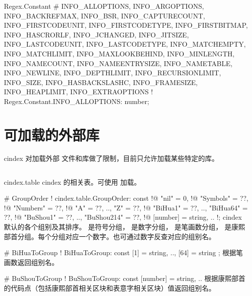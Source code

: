 \documentclass[class=article,doc={kv-usage}]{cusdoc}
\newcommand*\LUA{\texorpdfstring{\textcon{lua}}{lua}}
\begin{document}
\begin{luadoc*}{Regex.Constant}
# INFO_ALLOPTIONS, INFO_ARGOPTIONS, INFO_BACKREFMAX, INFO_BSR, INFO_CAPTURECOUNT, INFO_FIRSTCODEUNIT, INFO_FIRSTCODETYPE, INFO_FIRSTBITMAP, INFO_HASCRORLF, INFO_JCHANGED, INFO_JITSIZE, INFO_LASTCODEUNIT, INFO_LASTCODETYPE, INFO_MATCHEMPTY, INFO_MATCHLIMIT, INFO_MAXLOOKBEHIND, INFO_MINLENGTH, INFO_NAMECOUNT, INFO_NAMEENTRYSIZE, INFO_NAMETABLE, INFO_NEWLINE, INFO_DEPTHLIMIT, INFO_RECURSIONLIMIT, INFO_SIZE, INFO_HASBACKSLASHC, INFO_FRAMESIZE, INFO_HEAPLIMIT, INFO_EXTRAOPTIONS
! Regex.Constant.INFO_ALLOPTIONS: number;
\end{luadoc*}


\section{可加载的外部库}

cindex 对加载外部 \LUA 文件和库做了限制，目前只允许加载某些特定的库。

\subsection{}

\begin{luadoc}[global]{cindex.table}
cindex 的相关表。可使用  加载。
\end{luadoc}

\begin{luadoc*}{}
# GroupOrder
! cindex.table.GroupOrder: const {
!@  "nil" = 0,
!@  "Symbols" = ??,
!@  "Numbers" = ??,
!@  "A" = ??, .., "Z" = ??,
!@  "BiHua1" = ??, .., "BiHua64" = ??,
!@  "BuShou1" = ??, .., "BuShou214" = ??,
!@  [number] = string, ..
!};
cindex 默认的各个组别及其排序。 是符号分组， 是数字分组， 是笔画数分组， 是康熙部首分组。每个分组对应一个数字。也可通过数字反查对应的组别名。
\end{luadoc*}

\begin{luadoc*}{}
# BiHuaToGroup
! BiHuaToGroup: const { [1] = string, .., [64] = string };
根据笔画数返回组别名。
\end{luadoc*}

\begin{luadoc*}{}
# BuShouToGroup
! BuShouToGroup: const { [number] = string, .. }
根据康熙部首的代码点（包括康熙部首相关区块和表意字相关区块）值返回组别名。
\end{luadoc*}
\end{document}

